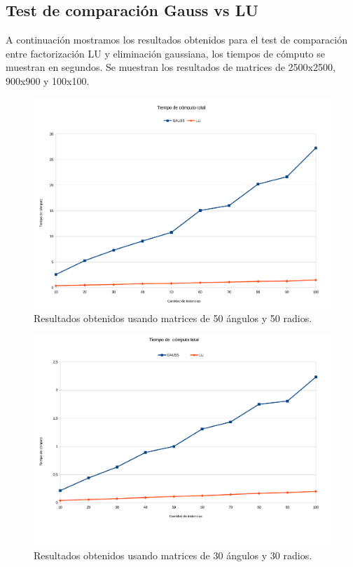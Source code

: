 \subsection{Test de comparación Gauss vs LU}

A continuación mostramos los resultados obtenidos para el test de comparación entre factorización LU y eliminación gaussiana, los tiempos de cómputo se muestran en segundos. Se muestran los resultados de matrices de 2500x2500, 900x900 y 100x100. 


\begin{figure}[H]{}
\centering
\includegraphics[scale=0.5]{graphs/gaussVsLU1.pdf}
\caption{Resultados obtenidos usando matrices de 50 ángulos y 50 radios.}
\label{gaussVsLU1}
\end{figure}

\begin{figure}[H]{}
\centering
\includegraphics[scale=0.5]{graphs/gaussVsLU2.pdf}
\caption{Resultados obtenidos usando matrices de 30 ángulos y 30 radios.}
\label{gaussVsLU2}
\end{figure}

